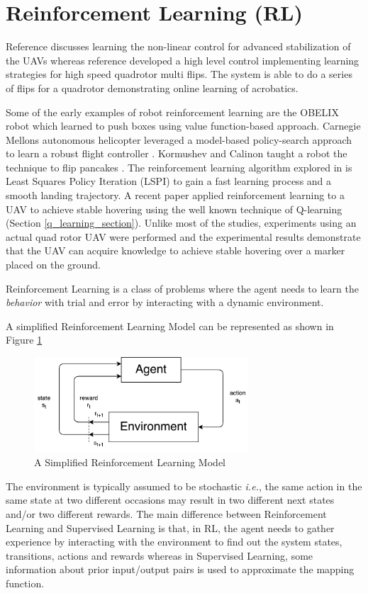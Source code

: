 \documentclass[12pt]{report}
\newcommand{\ie}{\textit{i.e.}}
\begin{document}
\section{Reinforcement Learning (RL)}
\label{rl}

Reference \cite{bou2010controller} discusses learning the non-linear control for advanced stabilization of the UAVs whereas reference \cite{lupashin2010simple} developed a high level control implementing learning strategies for high speed quadrotor multi flips. The system is able to do a series of flips for a quadrotor demonstrating online learning of acrobatics.\par  
Some of the early examples of robot reinforcement learning are the OBELIX robot which learned to push boxes \cite{mahadevan1992automatic} using value function-based approach. Carnegie Mellon\textquotesingle s autonomous helicopter leveraged a model-based policy-search approach to learn a robust flight controller \cite{bagnell2001autonomous}. Kormushev and Calinon taught a robot the technique to flip pancakes \cite{kormushev2010robot}. The reinforcement learning algorithm explored in \cite{Shaker:2010:VLS:1901614.1902128} is Least Squares Policy Iteration (LSPI) to gain a fast learning process and a smooth landing trajectory. A recent paper \cite{sugimoto2016acquisition} applied reinforcement learning to a UAV to achieve stable hovering using the well known technique of Q-learning (Section \ref{q_learning_section}). Unlike most of the studies, experiments using an actual quad rotor UAV were performed and the experimental results demonstrate that the UAV can acquire knowledge to achieve stable hovering over a marker placed on the ground.\par 

Reinforcement Learning is a class of problems where the agent needs to learn the \textit{behavior} with trial and error by interacting with a dynamic environment.

A simplified Reinforcement Learning Model can be represented as shown in Figure \ref{fig:rl_model}
\begin{figure}[htp]
	\centering
	\includegraphics[width=8cm]{rl_model.pdf}
	\caption {A Simplified Reinforcement Learning Model}
   \label{fig:rl_model}
\end{figure}
The environment is typically assumed to be stochastic \ie, the same action in the same state at two different occasions may result in two different next states and/or two different rewards. The main difference between Reinforcement Learning and Supervised Learning is that, in RL, the agent needs to gather experience by interacting with the environment to find out the system states, transitions, actions and rewards whereas in Supervised Learning, some information about prior input/output pairs is used to approximate the mapping function.
\end{document}
